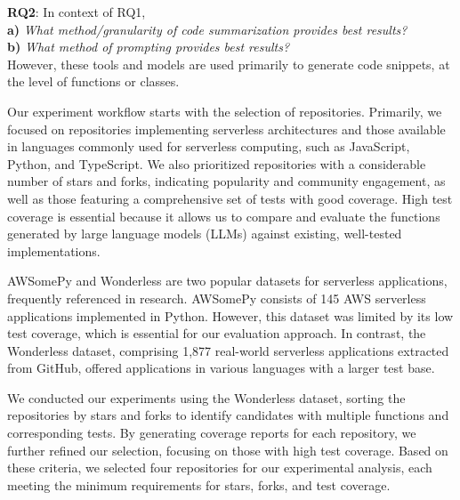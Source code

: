 \textbf{RQ2}: In context of RQ1,\\
\textbf{a)} \textit{What method/granularity of code summarization provides best results?} \\
\textbf{b)} \textit{What method of prompting provides best results?} \\

However, these tools and models are used primarily to generate code snippets, at the level of functions or classes. 

Our experiment workflow starts with the selection of repositories. Primarily, we focused on repositories implementing serverless architectures and those available in languages commonly used for serverless computing, such as JavaScript, Python, and TypeScript. We also prioritized repositories with a considerable number of stars and forks, indicating popularity and community engagement, as well as those featuring a comprehensive set of tests with good coverage. High test coverage is essential because it allows us to compare and evaluate the functions generated by large language models (LLMs) against existing, well-tested implementations.

AWSomePy \cite{giuseppe_awsomepy} and Wonderless \cite{eskandani2021wonderless} are two popular datasets for serverless applications, frequently referenced in research. AWSomePy consists of 145 AWS serverless applications implemented in Python. However, this dataset was limited by its low test coverage, which is essential for our evaluation approach. In contrast, the Wonderless dataset, comprising 1,877 real-world serverless applications extracted from GitHub, offered applications in various languages with a larger test base. 

We conducted our experiments using the Wonderless dataset, sorting the repositories by stars and forks to identify candidates with multiple functions and corresponding tests. By generating coverage reports for each repository, we further refined our selection, focusing on those with high test coverage. Based on these criteria, we selected four repositories for our experimental analysis, each meeting the minimum requirements for stars, forks, and test coverage.

